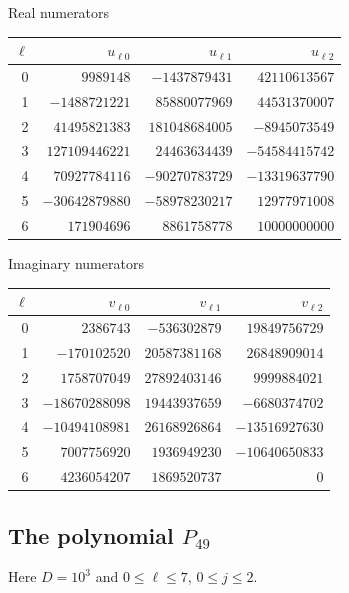 \documentclass[UTF8,11pt]{ctexart}
\theoremstyle{definition}
\numberwithin{equation}{section}
\begin{document}
\begin{center}
\begin{minipage}{\textwidth}\centering
\small
Real numerators
\smallskip

\begin{tabular}{rrrr}
\toprule
$\ell$ & $u_{\ell0}$ & $u_{\ell1}$ & $u_{\ell2}$ \\
\midrule
0 & $9989148$ & $-1437879431$ & $42110613567$ \\
1 & $-1488721221$ & $85880077969$ & $44531370007$ \\
2 & $41495821383$ & $181048684005$ & $-8945073549$ \\
3 & $127109446221$ & $24463634439$ & $-54584415742$ \\
4 & $70927784116$ & $-90270783729$ & $-13319637790$ \\
5 & $-30642879880$ & $-58978230217$ & $12977971008$ \\
6 & $171904696$ & $8861758778$ & $10000000000$ \\
\bottomrule
\end{tabular}
\end{minipage}
\end{center}

\begin{center}
\begin{minipage}{\textwidth}\centering
\small
Imaginary numerators
\smallskip

\begin{tabular}{rrrr}
\toprule
$\ell$ & $v_{\ell0}$ & $v_{\ell1}$ & $v_{\ell2}$ \\
\midrule
0 & $2386743$ & $-536302879$ & $19849756729$ \\
1 & $-170102520$ & $20587381168$ & $26848909014$ \\
2 & $1758707049$ & $27892403146$ & $9999884021$ \\
3 & $-18670288098$ & $19443937659$ & $-6680374702$ \\
4 & $-10494108981$ & $26168926864$ & $-13516927630$ \\
5 & $7007756920$ & $1936949230$ & $-10640650833$ \\
6 & $4236054207$ & $1869520737$ & $0$ \\
\bottomrule
\end{tabular}
\end{minipage}
\end{center}

\subsection*{The polynomial \texorpdfstring{$P_{49}$}{P49}}
Here $D=10^3$ and $0\le\ell\le 7$, $0\le j\le2$.
\end{document}
